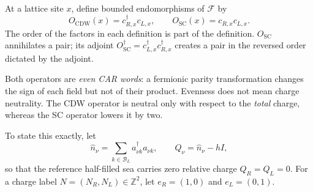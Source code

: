 \begin{definition}
\label{def:ch20-order-words}
At a lattice site \(x\), define bounded endomorphisms of \(\mathcal F\) by
\begin{equation}
  O_{\mathrm{CDW}}(x)=c_{R,x}^{\dagger}c_{L,x},\qquad
  O_{\mathrm{SC}}(x)=c_{R,x}c_{L,x}.
  \label{eq:ch20-order-words}
\end{equation}
The order of the factors in each definition is part of the definition.
\(O_{\mathrm{SC}}\) annihilates a pair; its adjoint
\(O_{\mathrm{SC}}^{\dagger}=c_{L,x}^{\dagger}c_{R,x}^{\dagger}\)
creates a pair in the reversed order dictated by the adjoint.
\end{definition}

Both operators are \emph{even CAR words}: a fermionic parity transformation
changes the sign of each field but not of their product.  Evenness does not
mean charge neutrality.  The CDW operator is neutral only with respect to
the \emph{total} charge, whereas the SC operator lowers it by two.

To state this exactly, let
\begin{equation}
  \widehat n_{\nu}=\sum_{k\in\mathcal B_L}
     a_{\nu k}^{\dagger}a_{\nu k},\qquad
  Q_{\nu}=\widehat n_{\nu}-hI,
 \label{eq:ch20-charges}
\end{equation}
so that the reference half-filled sea carries zero relative charge
\(Q_R=Q_L=0\).  For a charge label
\(N=(N_R,N_L)\in\mathbb Z^2\), let
\(e_R=(1,0)\) and \(e_L=(0,1)\).

